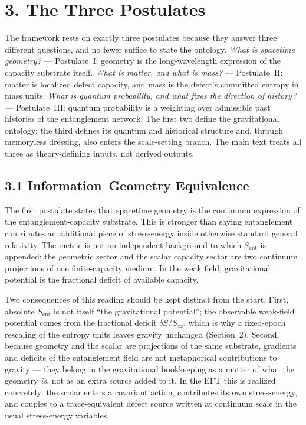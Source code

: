 \documentclass[11pt]{article}
\begin{document}
\section{3. The Three Postulates}

The framework rests on exactly three postulates because they answer three different questions, and no fewer suffice to state the ontology. \emph{What is spacetime geometry?} --- Postulate~I: geometry is the long-wavelength expression of the capacity substrate itself. \emph{What is matter, and what is mass?} --- Postulate~II: matter is localized defect capacity, and mass is the defect's committed entropy in mass units. \emph{What is quantum probability, and what fixes the direction of history?} --- Postulate~III: quantum probability is a weighting over admissible past histories of the entanglement network. The first two define the gravitational ontology; the third defines its quantum and historical structure and, through memoryless dressing, also enters the scale-setting branch. The main text treats all three as theory-defining inputs, not derived outputs.

\subsection{3.1 Information--Geometry Equivalence}

The first postulate states that spacetime geometry is the continuum expression of the entanglement-capacity substrate. This is stronger than saying entanglement contributes an additional piece of stress-energy inside otherwise standard general relativity. The metric is not an independent background to which $S_{\mathrm{ent}}$ is appended; the geometric sector and the scalar capacity sector are two continuum projections of one finite-capacity medium. In the weak field, gravitational potential is the fractional deficit of available capacity.

Two consequences of this reading should be kept distinct from the start. First, absolute $S_{\mathrm{ent}}$ is not itself ``the gravitational potential''; the observable weak-field potential comes from the fractional deficit $\delta S/S_\infty$, which is why a fixed-epoch rescaling of the entropy units leaves gravity unchanged (Section~2). Second, because geometry and the scalar are projections of the same substrate, gradients and deficits of the entanglement field are not metaphorical contributions to gravity --- they belong in the gravitational bookkeeping as a matter of what the geometry \emph{is}, not as an extra source added to it. In the EFT this is realized concretely: the scalar enters a covariant action, contributes its own stress-energy, and couples to a trace-equivalent defect source written at continuum scale in the usual stress-energy variables.
\end{document}
